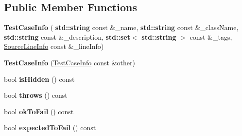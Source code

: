 \subsection*{Public Member Functions}
\begin{DoxyCompactItemize}
\item 
\mbox{\label{struct_catch_1_1_test_case_info_a35ec65315e0d1f178491b5a59f3f3123}} 
{\bfseries Test\+Case\+Info} (\textbf{ std\+::string} const \&\+\_\+name, \textbf{ std\+::string} const \&\+\_\+class\+Name, \textbf{ std\+::string} const \&\+\_\+description, \textbf{ std\+::set}$<$ \textbf{ std\+::string} $>$ const \&\+\_\+tags, \hyperlink{struct_catch_1_1_source_line_info}{Source\+Line\+Info} const \&\+\_\+line\+Info)
\item 
\mbox{\label{struct_catch_1_1_test_case_info_ac338adb4e38f4bf3977fb45b2b1fe447}} 
{\bfseries Test\+Case\+Info} (\hyperlink{struct_catch_1_1_test_case_info}{Test\+Case\+Info} const \&other)
\item 
\mbox{\label{struct_catch_1_1_test_case_info_a934b1a0952700743e99d62ec1731a2e2}} 
bool {\bfseries is\+Hidden} () const
\item 
\mbox{\label{struct_catch_1_1_test_case_info_afc70d4379a2070cc22b693ffe3932c1a}} 
bool {\bfseries throws} () const
\item 
\mbox{\label{struct_catch_1_1_test_case_info_a5f37291295e3a6de2dd85324c941edaf}} 
bool {\bfseries ok\+To\+Fail} () const
\item 
\mbox{\label{struct_catch_1_1_test_case_info_abe33d81233230cdae8afa714688e905b}} 
bool {\bfseries expected\+To\+Fail} () const
\end{DoxyCompactItemize}
